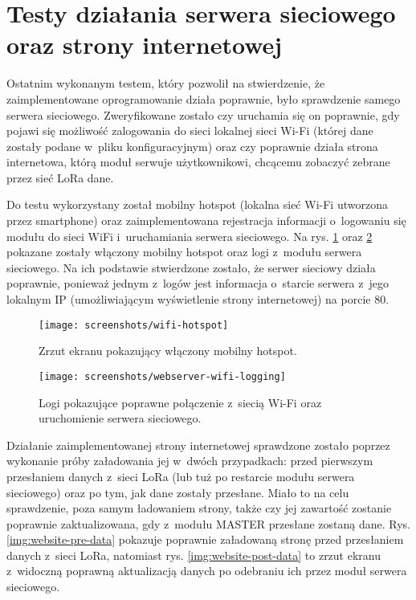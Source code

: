 \FloatBarrier
\section{\label{sect:test-webserver-website}Testy działania serwera sieciowego oraz strony internetowej} Ostatnim
wykonanym testem, który pozwolił na stwierdzenie, że zaimplementowane oprogramowanie działa poprawnie, było sprawdzenie
samego serwera sieciowego. Zweryfikowane zostało czy uruchamia się on poprawnie, gdy pojawi się możliwość zalogowania do
sieci lokalnej sieci Wi-Fi (której dane zostały podane w~pliku konfiguracyjnym) oraz czy poprawnie działa strona
internetowa, którą moduł serwuje użytkownikowi, chcącemu zobaczyć zebrane przez sieć LoRa dane.

Do testu wykorzystany został mobilny hotspot (lokalna sieć Wi-Fi utworzona przez smartphone) oraz zaimplementowana
rejestracja informacji o~logowaniu się modułu do sieci WiFi i~uruchamiania serwera sieciowego. Na rys.
\ref{img:wifi-hotspot} oraz \ref{img:webserver-wifi-logging} pokazane zostały włączony mobilny hotspot oraz logi
z~modułu serwera sieciowego. Na ich podstawie stwierdzone zostało, że serwer sieciowy działa poprawnie, ponieważ jednym
z~logów jest informacja o~starcie serwera z~jego lokalnym IP (umożliwiającym wyświetlenie strony internetowej) na porcie
80.

\begin{figure}[!htbp]
    \centering
    \texttt{[image: screenshots/wifi-hotspot]}
    \caption{\label{img:wifi-hotspot}Zrzut ekranu pokazujący włączony mobilny hotspot.}
\end{figure}

\begin{figure}[!htbp]
    \centering
    \texttt{[image: screenshots/webserver-wifi-logging]}
    \caption{\label{img:webserver-wifi-logging}Logi pokazujące poprawne połączenie z~siecią Wi-Fi oraz uruchomienie
        serwera sieciowego.}
\end{figure}

\FloatBarrier
Działanie zaimplementowanej strony internetowej sprawdzone zostało poprzez wykonanie próby załadowania jej w~dwóch
przypadkach: przed pierwszym przesłaniem danych z~sieci LoRa (lub tuż po restarcie modułu serwera sieciowego) oraz po
tym, jak dane zostały przesłane. Miało to na celu sprawdzenie, poza samym ładowaniem strony, także czy jej zawartość
zostanie poprawnie zaktualizowana, gdy z~modułu MASTER przesłane zostaną dane. Rys. \ref{img:website-pre-data} pokazuje
poprawnie załadowaną stronę przed przesłaniem danych z~sieci LoRa, natomiast rys. \ref{img:website-post-data} to zrzut
ekranu z~widoczną poprawną aktualizacją danych po odebraniu ich przez moduł serwera sieciowego.

